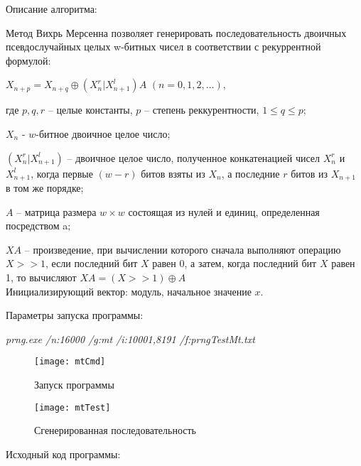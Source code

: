 \documentclass[bachelor, och, coursework]{shiza}
\begin{document}
	Описание алгоритма:
	
	Метод Вихрь Мерсенна позволяет генерировать последовательность двоичных псевдослучайных целых w-битных чисел в соответствии с рекуррентной формулой:
	\begin{center}
	$X_{n + p} = X_{n + q} \oplus (X_n^r | X_{n + 1}^l )A$ $ (n = 0,1,2, \dots),$
	\end{center}

	где $p, q, r$ – целые константы, $p$ – степень реккурентности, $1 \leq q \leq p$;
	
	$X_n$ - $w$-битное двоичное целое число;
	
	$(X_n^r | X_{n+1}^l )$ – двоичное целое число, полученное конкатенацией чисел $X_n^r$ и $X_{n+1}^l$, когда первые $(w-r)$ битов взяты из $X_n$, а последние $r$ битов из $X_{n+1}$ в том же порядке;
	
	$A$ – матрица размера $w \times w$  состоящая из нулей и единиц, определенная посредством a;
	
	$XA$ – произведение, при вычислении которого сначала выполняют операцию $X >> 1$, если последний бит $X$ равен 0, а затем, когда последний бит $X$ равен 1, то вычисляют $XA=(X >> 1)  \oplus A$	\\
	
	Инициализирующий вектор: модуль, начальное значение $x$.
	
	Параметры запуска программы:
	
	\textit{prng.exe /n:16000 /g:mt /i:10001,8191 /f:prngTestMt.txt}
	
	\begin{figure}[H]
	\centering
		\texttt{[image: mtCmd]}
		\caption{Запуск программы}
		\label{fig:mtCmd}
	\end{figure}
	
	\begin{figure}[H]
		\centering
		\texttt{[image: mtTest]}
		\caption{Сгенерированная последовательность}
		\label{fig:mtTest}
	\end{figure}	
	
		Исходный код программы:
	
\end{document}
